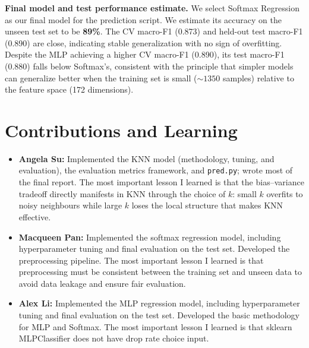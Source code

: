 \documentclass[12pt]{article}
\begin{document}
\textbf{Final model and test performance estimate.} We select Softmax Regression as our final model for the prediction script. We estimate its accuracy on the unseen test set to be \textbf{89\%}. The CV macro-F1 (0.873) and held-out test macro-F1 (0.890) are close, indicating stable generalization with no sign of overfitting. Despite the MLP achieving a higher CV macro-F1 (0.890), its test macro-F1 (0.880) falls below Softmax's, consistent with the principle that simpler models can generalize better when the training set is small (${\sim}1350$ samples) relative to the feature space (172 dimensions).

\section{Contributions and Learning}

\begin{itemize}
    \item \textbf{Angela Su:} Implemented the KNN model (methodology, tuning, and evaluation), the evaluation metrics framework, and \texttt{pred.py}; wrote most of the final report. The most important lesson I learned is that the bias--variance tradeoff directly manifests in KNN through the choice of $k$: small $k$ overfits to noisy neighbours while large $k$ loses the local structure that makes KNN effective.
    \item \textbf{Macqueen Pan:} Implemented the softmax regression model, including hyperparameter tuning and final evaluation on the test set. Developed the preprocessing pipeline. The most important lesson I learned is that preprocessing must be consistent between the training set and unseen data to avoid data leakage and ensure fair evaluation.
    \item \textbf{Alex Li:} Implemented the MLP regression model, including hyperparameter tuning and final evaluation on the test set. Developed the basic methodology for MLP and Softmax. The most important lesson I learned is that sklearn MLPClassifier does not have drop rate choice input.
\end{itemize}



\end{document}
